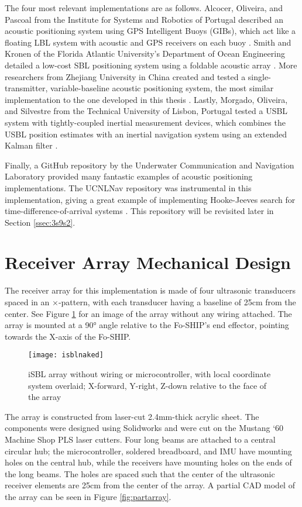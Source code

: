 \documentclass[11pt]{ucthesisCP}
\begin{document}
The four most relevant implementations are as follows. Alcocer, Oliveira, and Pascoal from the Institute for Systems and Robotics of Portugal described an acoustic positioning system using GPS Intelligent Buoys (GIBs), which act like a floating LBL system with acoustic and GPS receivers on each buoy \cite{gibs}. Smith and Kronen of the Florida Atlantic University’s Department of Ocean Engineering detailed a low-cost SBL positioning system using a foldable acoustic array \cite{lowcostsbl}. More researchers from Zhejiang University in China created and tested a single-transmitter, variable-baseline acoustic positioning system, the most similar implementation to the one developed in this thesis \cite{singletrans}. Lastly, Morgado, Oliveira, and Silvestre from the Technical University of Lisbon, Portugal tested a USBL system with tightly-coupled inertial measurement devices, which combines the USBL position estimates with an inertial navigation system using an extended Kalman filter \cite{tightekf}.

Finally, a GitHub repository by the Underwater Communication and Navigation Laboratory provided many fantastic examples of acoustic positioning implementations. The UCNLNav repository was instrumental in this implementation, giving a great example of implementing Hooke-Jeeves search for time-difference-of-arrival systems \cite{ucnlnav}. This repository will be revisited later in Section \ref{ssec:3s9s2}.

\section{Receiver Array Mechanical Design} \label{sec:3s2}
The receiver array for this implementation is made of four ultrasonic transducers spaced in an \(\times\)-pattern, with each transducer having a baseline of 25cm from the center. See Figure \ref{fig:isblnaked} for an image of the array without any wiring attached. The array is mounted at a 90° angle relative to the Fo-SHIP’s end effector, pointing towards the X-axis of the Fo-SHIP.

\begin{figure}[htbp]
	\centering
	\texttt{[image: isblnaked]}
	\caption{iSBL array without wiring or microcontroller, with local coordinate system overlaid; X-forward, Y-right, Z-down relative to the face of the array}
	\label{fig:isblnaked}
\end{figure}

The array is constructed from laser-cut 2.4mm-thick acrylic sheet. The components were designed using Solidworks and were cut on the Mustang ‘60 Machine Shop PLS laser cutters. Four long beams are attached to a central circular hub; the microcontroller, soldered breadboard, and IMU have mounting holes on the central hub, while the receivers have mounting holes on the ends of the long beams. The holes are spaced such that the center of the ultrasonic receiver elements are 25cm from the center of the array. A partial CAD model of the array can be seen in Figure \ref{fig:partarray}.
\end{document}
